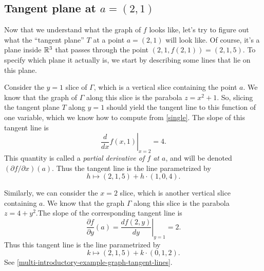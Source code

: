 \subsection*{Tangent plane at \texorpdfstring{$a = (2,1)$}{a = (2,1)}}

Now that we understand what the graph of $f$ looks like, let's try to figure out what the ``tangent plane'' $T$ at a point $a = (2,1)$ will look like. Of course, it's a plane inside $\mathbb{R}^3$ that passes through the point $(2, 1, f(2,1)) = (2, 1, 5)$. To specify which plane it actually is, we start by describing some lines that lie on this plane. 

Consider the $y = 1$ slice of $\Gamma$, which is a vertical slice containing the point $a$. We know that the graph of $\Gamma$ along this slice is the parabola $z = x^2 + 1$. So, slicing the tangent plane $T$ along $y = 1$ should yield the tangent line to this function of one variable, which we know how to compute from \cref{single}. The slope of this tangent line is
\[ \left.\frac{d }{d x} f(x, 1) \right|_{x = 2} = 4. \]
This quantity is called a \emph{partial derivative of $f$ at $a$}, and will be denoted $(\partial f/\partial x)(a)$.  Thus the tangent line is the line parametrized by
\[ h \mapsto (2,1,5) + h \cdot (1, 0, 4). \]

Similarly, we can consider the $x = 2$ slice, which is another vertical slice containing $a$. We know that the graph $\Gamma$ along this slice is the parabola $z = 4 + y^2$.The slope of the corresponding tangent line is
\[ \frac{\partial f}{\partial y}(a) = \left.\frac{d f(2, y)}{dy}\right|_{y = 1} = 2. \]
Thus this tangent line is the line parametrized by
\[ k \mapsto (2,1,5) + k \cdot (0,1,2). \]
See \cref{multi-introductory-example-graph-tangent-lines}.


